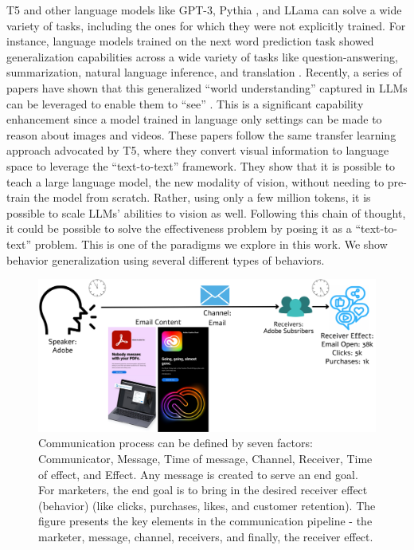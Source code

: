 T5 and other language models like GPT-3, Pythia \cite{biderman2023pythia}, and LLama \cite{touvron2023llama} can solve a wide variety of tasks, including the ones for which they were not explicitly trained. For instance, language models trained on the next word prediction task showed generalization capabilities across a wide variety of tasks like question-answering, summarization, natural language inference, and translation \cite{brown2020language}. Recently, a series of papers have shown that this generalized ``world understanding'' captured in LLMs can be leveraged to enable them to ``see'' \cite{liu2023visual,li2023videochat,li2023blip2,zhu2023minigpt,ge2023planting,zhang2023video,bhattacharya2023video}. This is a significant capability enhancement since a model trained in language only settings can be made to reason about images and videos. These papers follow the same transfer learning approach advocated by T5, where they convert visual information to language space to leverage the ``text-to-text'' framework. They show that it is possible to teach a large language model, the new modality of vision, without needing to pre-train the model from scratch. Rather, using only a few million tokens, it is possible to scale LLMs' abilities to vision as well. Following this chain of thought, it could be possible to solve the effectiveness problem by posing it as a ``text-to-text'' problem. This is one of the paradigms we explore in this work. We show behavior generalization using several different types of behaviors.





\begin{figure}[!t]
  \centering
  \includegraphics[width=1.0\textwidth]{images/factors of communication.pdf}
  \caption{Communication process can be defined by seven factors: Communicator, Message, Time of message, Channel, Receiver, Time of effect, and Effect. Any message is created to serve an end goal. For marketers, the end goal is to bring in the desired receiver effect (behavior) (like clicks, purchases, likes, and customer retention). The figure presents the key elements in the communication pipeline - the marketer, message, channel, receivers, and finally, the receiver effect. \label{fig:factors-of-communication-chapter-lcbm}}
\end{figure}




